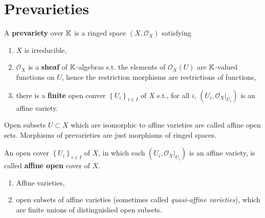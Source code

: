 \section{Prevarieties}

\begin{defn}[Prevariety]
	A \textbf{prevariety} over $\mathbb{K}$ is a ringed space $\left( X, \mathcal{O}_{ X } \right)$ satisfying
	\begin{enumerate}
		\item $X$ is irreducible,
		\item $\mathcal{O}_X$ is a \textbf{sheaf} of $\mathbb{K}$-algebras s.t. the elements of $\mathcal{O}_X(U)$ are $\mathbb{K}$-valued functions on $U$, hence the restriction morphisms are restrictions of functions,
		\item there is a \textbf{finite} open conver $\left\{ U_i \right\}_{i \in I}$ of $X$ s.t., for all $i$, $\left(U_i, \left.\mathcal{O}_X\right|_{U_i} \right)$ is an affine variety.
	\end{enumerate}
	Open subsets $U \subset X$ which are isomorphic to affine varieties are called affine open sets.
	Morphisms of prevarieties are just morphisms of ringed spaces.
\end{defn}
\begin{rem}[]
	An open cover $\left\{ U_i \right\}_{i \in I}$ of $X$,
	in which each $\left( U_i, \left.\mathcal{O}_{ X }\right|_{U_i}  \right)$ is an affine variety,
	is called \textbf{affine open} cover of $X$.
\end{rem}


\begin{ex}\leavevmode\vspace{-.2\baselineskip}
	\begin{enumerate}
		\item Affine varieties,
		\item open subsets of affine varieties (sometimes called \textit{quasi-affine varieties}), which are finite unions of distinguished open subsets.
	\end{enumerate}
\end{ex} 


